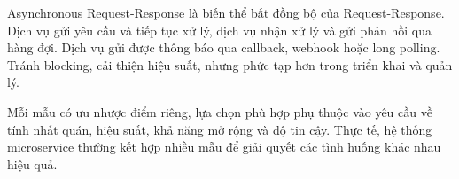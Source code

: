 Asynchronous Request-Response là biến thể bất đồng bộ của Request-Response. Dịch vụ gửi yêu cầu và tiếp tục xử lý, dịch vụ nhận xử lý và gửi phản hồi qua hàng đợi. Dịch vụ gửi được thông báo qua callback, webhook hoặc long polling. Tránh blocking, cải thiện hiệu suất, nhưng phức tạp hơn trong triển khai và quản lý.

Mỗi mẫu có ưu nhược điểm riêng, lựa chọn phù hợp phụ thuộc vào yêu cầu về tính nhất quán, hiệu suất, khả năng mở rộng và độ tin cậy. Thực tế, hệ thống microservice thường kết hợp nhiều mẫu để giải quyết các tình huống khác nhau hiệu quả.